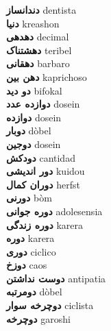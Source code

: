 \textbf{ دندانساز  } dentista \\
\textbf{ دنیا  } kreashon \\
\textbf{ دهدهی  } decimal \\
\textbf{ دهشتناک  } teribel \\
\textbf{ دهقانی  } barbaro \\
\textbf{ دهن بین  } kaprichoso \\
\textbf{ دو دید  } bifokal \\
\textbf{ دوازده عدد  } dosein \\
\textbf{ دوازده  } dosein \\
\textbf{ دوبار  } dòbel \\
\textbf{ دوجین  } dosein \\
\textbf{ دودکش  } cantidad \\
\textbf{ دور اندیشی  } kuidou \\
\textbf{ دوران کمال  } herfst \\
\textbf{ دورنی  } bòm \\
\textbf{ دوره جوانی  } adolesensia \\
\textbf{ دوره زندگی  } karera \\
\textbf{ دوره  } karera \\
\textbf{ دوری  } ciclico \\
\textbf{ دوزخ  } caos \\
\textbf{ دوست نداشتن  } antipatia \\
\textbf{ دومرتبه  } dòbel \\
\textbf{ دوچرخه سوار  } ciclista \\
\textbf{ دوچرخه  } garoshi \\
